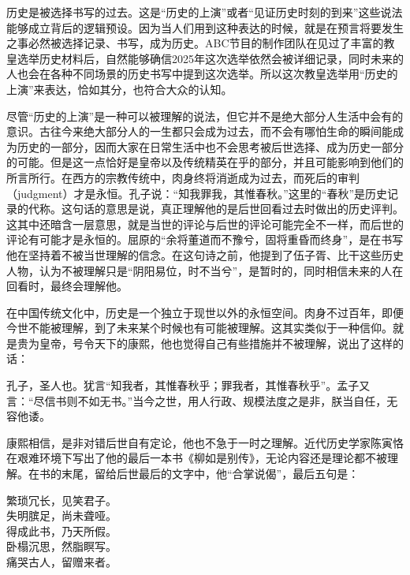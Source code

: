 
历史是被选择书写的过去。这是“历史的上演”或者“见证历史时刻的到来”这些说法能够成立背后的逻辑预设。因为当人们用到这种表达的时候，就是在预言将要发生之事必然被选择记录、书写，成为历史。ABC节目的制作团队在见过了丰富的教皇选举历史材料后，自然能够确信2025年这次选举依然会被详细记录，同时未来的人也会在各种不同场景的历史书写中提到这次选举。所以这次教皇选举用“历史的上演”来表达，恰如其分，也符合大众的认知。



尽管“历史的上演”是一种可以被理解的说法，但它并不是绝大部分人生活中会有的意识。古往今来绝大部分人的一生都只会成为过去，而不会有哪怕生命的瞬间能成为历史的一部分，因而大家在日常生活中也不会思考被后世选择、成为历史一部分的可能。但是这一点恰好是皇帝以及传统精英在乎的部分，并且可能影响到他们的所言所行。在西方的宗教传统中，肉身终将消逝成为过去，而死后的审判（judgment）才是永恒。孔子说：“知我罪我，其惟春秋。”这里的“春秋”是历史记录的代称。这句话的意思是说，真正理解他的是后世回看过去时做出的历史评判。这其中还暗含一层意思，就是当世的评论与后世的评论可能完全不一样，而后世的评论有可能才是永恒的。屈原的“余将董道而不豫兮，固将重昏而终身”，是在书写他在坚持着不被当世理解的信念。在这句诗之前，他提到了伍子胥、比干这些历史人物，认为不被理解只是“阴阳易位，时不当兮”，是暂时的，同时相信未来的人在回看时，最终会理解他。



在中国传统文化中，历史是一个独立于现世以外的永恒空间。肉身不过百年，即便今世不能被理解，到了未来某个时候也有可能被理解。这其实类似于一种信仰。就是贵为皇帝，号令天下的康熙，他也觉得自己有些措施并不被理解，说出了这样的话：



\begin{bookquote}孔子，圣人也。犹言“知我者，其惟春秋乎；罪我者，其惟春秋乎”。孟子又言：“尽信书则不如无书。”当今之世，用人行政、规模法度之是非，朕当自任，无容他诿。\end{bookquote}


康熙相信，是非对错后世自有定论，他也不急于一时之理解。近代历史学家陈寅恪在艰难环境下写出了他的最后一本书《柳如是别传》，无论内容还是理论都不被理解。在书的末尾，留给后世最后的文字中，他“合掌说偈”，最后五句是：



\begin{bookquote}
繁琐冗长，见笑君子。\\
失明膑足，尚未聋哑。\\
得成此书，乃天所假。\\
卧榻沉思，然脂瞑写。\\
痛哭古人，留赠来者。
\end{bookquote}

